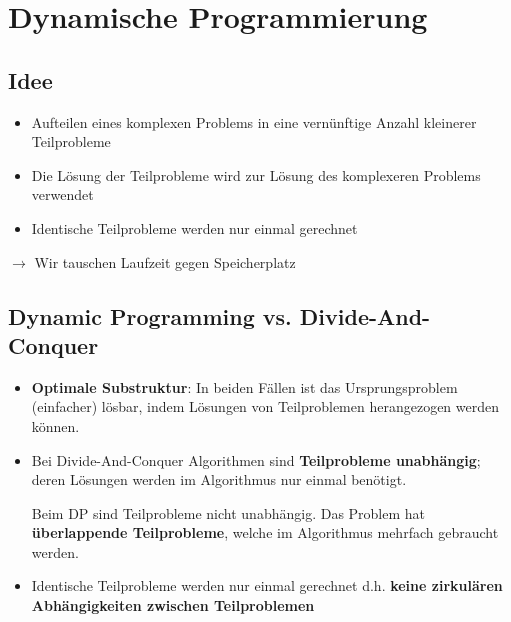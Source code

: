 \section{Dynamische Programmierung}
\vspace{-4pt}
\begin{sectionbox}
\subsection{Idee}\smallskip
\begin{itemize}
    \item Aufteilen eines komplexen Problems in eine vernünftige Anzahl kleinerer Teilprobleme
    \item Die Lösung der Teilprobleme wird zur Lösung des komplexeren Problems verwendet
    \item Identische Teilprobleme werden nur einmal gerechnet
\end{itemize}\smallskip
$\rightarrow$ Wir tauschen Laufzeit gegen Speicherplatz
\end{sectionbox}
\vspace{-4pt}
\begin{sectionbox}
\subsection{Dynamic Programming vs. Divide-And-Conquer}\smallskip
\begin{itemize}
    \item \textbf{Optimale Substruktur}: In beiden Fällen ist das Ursprungsproblem (einfacher) lösbar, indem Lösungen von Teilproblemen herangezogen werden können.
    \item Bei Divide-And-Conquer Algorithmen sind \textbf{Teilprobleme unabhängig}; deren Lösungen werden im Algorithmus nur einmal benötigt.\par
    Beim DP sind Teilprobleme nicht unabhängig. Das Problem hat \textbf{überlappende Teilprobleme}, welche im Algorithmus mehrfach gebraucht werden.
    \item Identische Teilprobleme werden nur einmal gerechnet d.h. \textbf{keine zirkulären Abhängigkeiten zwischen Teilproblemen}
\end{itemize}\smallskip
\end{sectionbox}
\vspace{-4pt}
